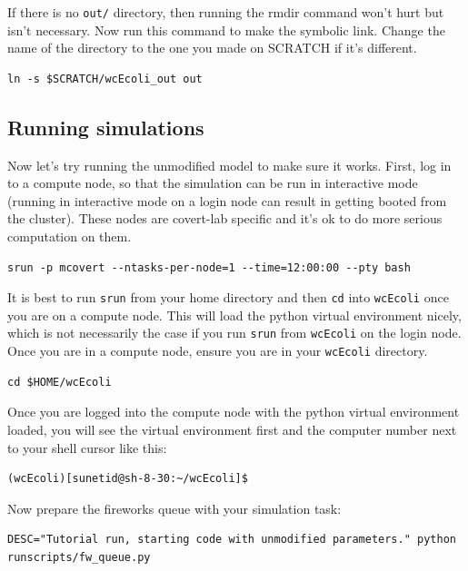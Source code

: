 \documentclass[12pt]{article}
\begin{document}
If there is no \texttt{out/} directory, then running the rmdir command won't hurt but isn't necessary. Now run this command to make the symbolic link. Change the name of the directory to the one you made on SCRATCH if it's different.

\lstset{language=bash}
\begin{lstlisting}
ln -s $SCRATCH/wcEcoli_out out
\end{lstlisting}

\subsection{Running simulations}

Now let's try running the unmodified model to make sure it works. First, log in to a compute node, so that the simulation can be run in interactive mode (running in interactive mode on a login node can result in getting booted from the cluster). These nodes are covert-lab specific and it's ok to do more serious computation on them.

\begin{lstlisting}
srun -p mcovert --ntasks-per-node=1 --time=12:00:00 --pty bash
\end{lstlisting}

It is best to run \texttt{srun} from your home directory and then \texttt{cd} into \texttt{wcEcoli} once you are on a compute node. This will load the python virtual environment nicely, which is not necessarily the case if you run \texttt{srun} from \texttt{wcEcoli} on the login node. Once you are in a compute node, ensure you are in your \texttt{wcEcoli} directory.

\begin{lstlisting}
cd $HOME/wcEcoli
\end{lstlisting}

Once you are logged into the compute node with the python virtual environment loaded, you will see the virtual environment first and the computer number next to your shell cursor like this:

\lstset{language=bash}
\begin{lstlisting}
(wcEcoli)[sunetid@sh-8-30:~/wcEcoli]$
\end{lstlisting}

Now prepare the fireworks queue with your simulation task:

\begin{lstlisting}
DESC="Tutorial run, starting code with unmodified parameters." python runscripts/fw_queue.py
\end{lstlisting}
\end{document}

